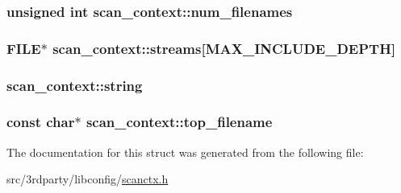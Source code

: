 \hypertarget{structscan__context_a62c81b43eb67d92788088d4835aa4d04}{
\subsubsection[{num\-\_\-filenames}]{\setlength{\rightskip}{0pt plus 5cm}unsigned int scan\-\_\-context\-::num\-\_\-filenames}}\label{structscan__context_a62c81b43eb67d92788088d4835aa4d04}
\hypertarget{structscan__context_a42b7e86466be147d557499f45d47cfb9}{
\subsubsection[{streams}]{\setlength{\rightskip}{0pt plus 5cm}F\-I\-L\-E$\ast$ scan\-\_\-context\-::streams\mbox{[}{\bf M\-A\-X\-\_\-\-I\-N\-C\-L\-U\-D\-E\-\_\-\-D\-E\-P\-T\-H}\mbox{]}}}\label{structscan__context_a42b7e86466be147d557499f45d47cfb9}
\hypertarget{structscan__context_aa23d5c633b40966b509c91068b72fc47}{
\subsubsection[{string}]{ scan\-\_\-context\-::string}}\label{structscan__context_aa23d5c633b40966b509c91068b72fc47}
\hypertarget{structscan__context_ae3db7eaa46cd30631e3f154bdc514feb}{
\subsubsection[{top\-\_\-filename}]{\setlength{\rightskip}{0pt plus 5cm}const char$\ast$ scan\-\_\-context\-::top\-\_\-filename}}\label{structscan__context_ae3db7eaa46cd30631e3f154bdc514feb}


The documentation for this struct was generated from the following file\-:\begin{DoxyCompactItemize}
\item 
src/3rdparty/libconfig/\hyperlink{scanctx_8h}{scanctx.\-h}\end{DoxyCompactItemize}
